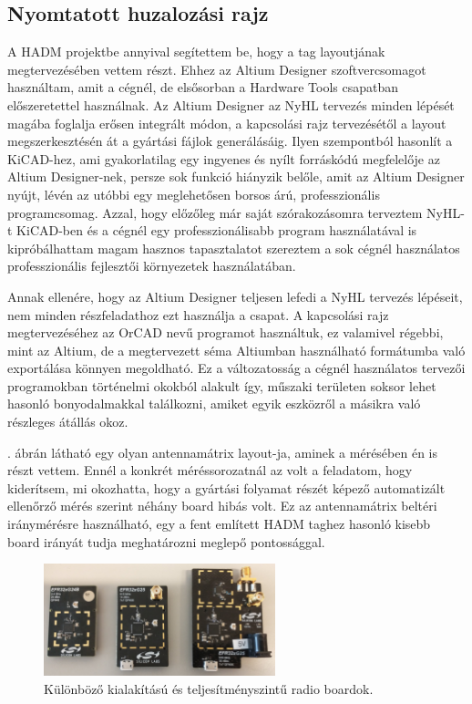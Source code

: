         \subsection{Nyomtatott huzalozási rajz}
        A HADM projektbe annyival segítettem be, hogy a tag layoutjának megtervezésében vettem részt. Ehhez az Altium Designer \cite{Altium} szoftvercsomagot használtam, amit a cégnél, de elsősorban a Hardware Tools csapatban előszeretettel használnak. Az Altium Designer az NyHL tervezés minden lépését magába foglalja erősen integrált módon, a kapcsolási rajz tervezésétől a layout megszerkesztésén át a gyártási fájlok generálásáig. Ilyen szempontból hasonlít a KiCAD-hez, ami gyakorlatilag egy ingyenes és nyílt forráskódú megfelelője az Altium Designer-nek, persze sok funkció hiányzik belőle, amit az Altium Designer nyújt, lévén az utóbbi egy meglehetősen borsos árú, professzionális programcsomag. Azzal, hogy előzőleg már saját szórakozásomra terveztem NyHL-t KiCAD-ben és a cégnél egy professzionálisabb program használatával is kipróbálhattam magam hasznos tapasztalatot szereztem a sok cégnél használatos professzionális fejlesztői környezetek használatában.
        \par
        Annak ellenére, hogy az Altium Designer teljesen lefedi a NyHL tervezés lépéseit, nem minden részfeladathoz ezt használja a csapat. A kapcsolási rajz megtervezéséhez az OrCAD nevű programot használtuk, ez valamivel régebbi, mint az Altium, de a megtervezett séma Altiumban használható formátumba való exportálása könnyen megoldható. Ez a változatosság a cégnél használatos tervezői programokban történelmi okokból alakult így, műszaki területen soksor lehet hasonló bonyodalmakkal találkozni, amiket egyik eszközről a másikra való részleges átállás okoz.
        \par
        . ábrán látható egy olyan antennamátrix layout-ja, aminek a mérésében én is részt vettem. Ennél a konkrét méréssorozatnál az volt a feladatom, hogy kiderítsem, mi okozhatta, hogy a gyártási folyamat részét képező automatizált ellenőrző mérés szerint néhány board hibás volt. Ez az antennamátrix beltéri iránymérésre használható, egy a fent említett HADM taghez hasonló kisebb board irányát tudja meghatározni meglepő pontossággal.
        \par
%
            \begin{figure}
                \centering
                \includegraphics[width=0.6\textwidth]{kep/szerkesztett/power-levels.jpg}
                \caption{Különböző kialakítású és teljesítményszintű radio boardok.}
                \label{fig:power-levels}
            \end{figure}
